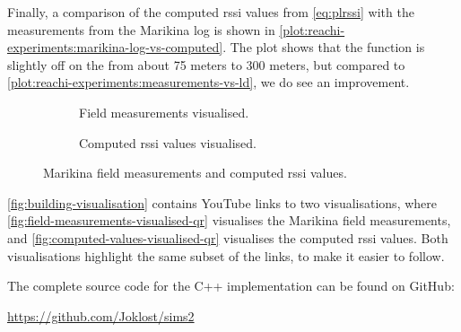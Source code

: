 Finally, a comparison of the computed \gls{rssi} values from \autoref{eq:plrssi} with the measurements from
the Marikina log is shown in \autoref{plot:reachi-experiments:marikina-log-vs-computed}. The plot shows that
the function is slightly off on the from about 75 meters to 300 meters, but compared to
\autoref{plot:reachi-experiments:measurements-vs-ld}, we do see an improvement.

\begin{figure}[ht]
    \centering
    \begin{subfigure}[b]{0.48\textwidth}
        \centering
        \caption{Field measurements visualised.}
        \label{fig:field-measurements-visualised-qr}
    \end{subfigure}
    \hfill
    \begin{subfigure}[b]{0.48\textwidth}
        \centering
        \caption{Computed \gls{rssi} values visualised.}
        \label{fig:computed-values-visualised-qr}
    \end{subfigure}
    \caption{Marikina field measurements and computed \gls{rssi} values.}
    \label{fig:building-visualisation}
\end{figure}

\autoref{fig:building-visualisation} contains YouTube links to two visualisations, where 
\autoref{fig:field-measurements-visualised-qr} visualises the Marikina field measurements, and 
\autoref{fig:computed-values-visualised-qr} visualises the computed \gls{rssi} values. Both visualisations
highlight the same subset of the links, to make it easier to follow. \medbreak

The complete source code for the C++ implementation can be found on GitHub:

\url{https://github.com/Joklost/sims2}
